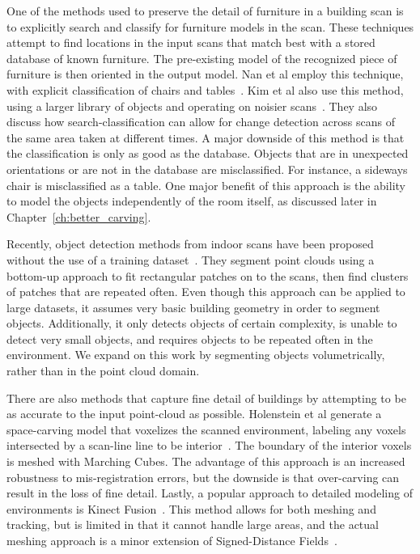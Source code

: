 \documentclass[12pt,onecolumn,oneside]{book}
\begin{document}
One of the methods used to preserve the detail of furniture in a building scan is to explicitly search and classify for furniture models in the scan.  These techniques attempt to find locations in the input scans that match best with a stored database of known furniture.  The pre-existing model of the recognized piece of furniture is then oriented in the output model.  Nan et al employ this technique, with explicit classification of chairs and tables~\cite{SearchClassifyPointcloud}.  Kim et al also use this method, using a larger library of objects and operating on noisier scans~\cite{Kim12}.  They also discuss how search-classification can allow for change detection across scans of the same area taken at different times.  A major downside of this method is that the classification is only as good as the database.  Objects that are in unexpected orientations or are not in the database are misclassified.  For instance, a sideways chair is misclassified as a table.  One major benefit of this approach is the ability to model the objects independently of the room itself, as discussed later in Chapter~\ref{ch:better_carving}.  

Recently, object detection methods from indoor scans have been proposed without the use of a training dataset~\cite{Mattausch14}.  They segment point clouds using a bottom-up approach to fit rectangular patches on to the scans, then find clusters of patches that are repeated often.  Even though this approach can be applied to large datasets, it assumes very basic building geometry in order to segment objects.  Additionally, it only detects objects of certain complexity, is unable to detect very small objects, and requires objects to be repeated often in the environment.  We expand on this work by segmenting objects volumetrically, rather than in the point cloud domain.

There are also methods that capture fine detail of buildings by attempting to be as accurate to the input point-cloud as possible.  Holenstein et al generate a space-carving model that voxelizes the scanned environment, labeling any voxels intersected by a scan-line line to be interior~\cite{Carving}.  The boundary of the interior voxels is meshed with Marching Cubes.  The advantage of this approach is an increased robustness to mis-registration errors, but the downside is that over-carving can result in the loss of fine detail.  Lastly, a popular approach to detailed modeling of environments is Kinect Fusion~\cite{KinectFusion,Kintinuous}.  This method allows for both meshing and tracking, but is limited in that it cannot handle large areas, and the actual meshing approach is a minor extension of Signed-Distance Fields~\cite{SignedDistanceFields}. 
\end{document}
